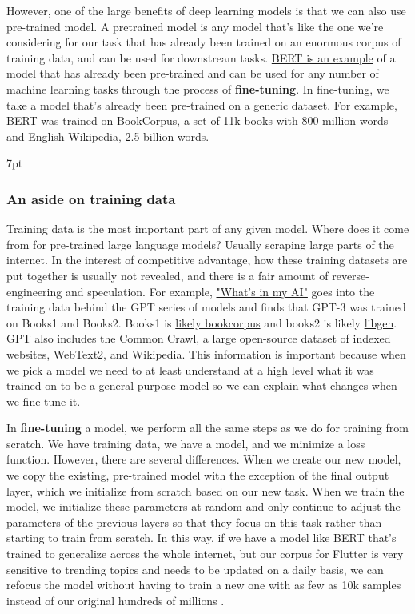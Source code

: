 \documentclass[11pt, table]{diazessay} %
\newenvironment{formal}{%
  \def\FrameCommand{%
	\hspace{1pt}%
	{\color{w_lightblue}\vrule width 2pt}%
	{\color{formalshade}\vrule width 4pt}%
	\colorbox{formalshade}%
  }%
  \MakeFramed{\advance\hsize-\width\FrameRestore}%
  \noindent\hspace{-4.55pt}%
  \begin{adjustwidth}{}{7pt}%
  \vspace{2pt}\vspace{2pt}%
}
{%
  \vspace{2pt}\end{adjustwidth}\endMakeFramed%
}
\begin{document}
\begin{sloppypar}
However, one of the large benefits of deep learning models is that we can also use pre-trained model. A pretrained model is any model that's like the one we're considering for our task that has already been trained on an enormous corpus of training data, and can be used for downstream tasks. \href{https://huggingface.co/docs/transformers/model_doc/bert}{BERT is an example} of a model that has already been pre-trained and can be used for any number of machine learning tasks through the process of \textbf{fine-tuning}. In fine-tuning, we take a model that's already been pre-trained on a generic dataset. For example, BERT was trained on \href{https://resources.wolframcloud.com/NeuralNetRepository/resources/BERT-Trained-on-BookCorpus-and-English-Wikipedia-Data}{BookCorpus, a set of 11k books with 800 million words and English Wikipedia, 2.5 billion words}.


\begin{formal}
\subsubsection*{An aside on training data}
Training data is the most important part of any given model. Where does it come from for pre-trained large language models? Usually scraping large parts of the internet. In the interest of competitive advantage, how these training datasets are put together is usually not revealed, and there is a fair amount of reverse-engineering and speculation. For example, \href{https://s10251.pcdn.co/pdf/2022-Alan-D-Thompson-Whats-in-my-AI-Rev-0.pdf}{"What's in my AI"} goes into the training data behind the GPT series of models and finds that GPT-3 was trained on Books1 and Books2. Books1 is \href{https://github.com/soskek/bookcorpus/issues/27#issuecomment-716104208}{likely bookcorpus} and books2 is likely \href{https://en.wikipedia.org/wiki/Library_Genesis}{libgen}. GPT also includes the Common Crawl, a large open-source dataset of indexed websites, WebText2, and Wikipedia. This information is important because when we pick  a model we need to at least understand at a high level what it was trained on to be a general-purpose model so we can explain what changes when we fine-tune it.
\end{formal}

In \textbf{fine-tuning} a model, we perform all the same steps as we do for training from scratch. We have training data, we have a model, and we minimize a loss function. However, there are several differences. When we create our new model, we copy the existing, pre-trained model with the exception of the final output layer, which we initialize from scratch based on our new task. When we train the model, we initialize these parameters at random and only continue to adjust the parameters of the previous layers so that they focus on this task rather than starting to train from scratch. In this way, if we have a model like BERT that's trained to generalize across the whole internet, but our corpus for Flutter is very sensitive to trending topics and needs to be updated on a daily basis, we can refocus the model without having to train a new one with as few as 10k samples instead of our original hundreds of millions \citep{zhang2020revisiting}.


\end{sloppypar}
\end{document}
